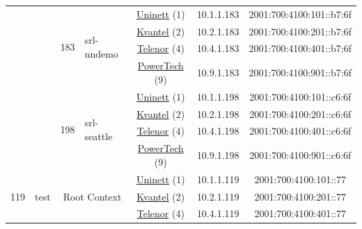 \begin{small}
\begin{center}
\begin{longtable}{|c|c|c|c|c|c|c|c|}
  &  & \multirow{4}{*}{\tiny{183}} & \multicolumn{1}{|l|}{\multirow{4}{*}{\tiny{srl-nndemo}}} & \multicolumn{2}{|c|}{\tiny{\href{https://www.uninett.no}{Uninett} (1)}} & \tiny{10.1.1.183} & \tiny{2001:700:4100:101::b7:6f} \\* \cline{5-5}\cline{6-6}\cline{7-7}\cline{8-8}
  &  &  &  & \multicolumn{2}{|c|}{\tiny{\href{http://kvantel.no}{Kvantel} (2)}} & \tiny{10.2.1.183} & \tiny{2001:700:4100:201::b7:6f} \\* \cline{5-5}\cline{6-6}\cline{7-7}\cline{8-8}
  &  &  &  & \multicolumn{2}{|c|}{\tiny{\href{https://www.telenor.no}{Telenor} (4)}} & \tiny{10.4.1.183} & \tiny{2001:700:4100:401::b7:6f} \\* \cline{5-5}\cline{6-6}\cline{7-7}\cline{8-8}
  &  &  &  & \multicolumn{2}{|c|}{\tiny{\href{http://www.powertech.no}{PowerTech} (9)}} & \tiny{10.9.1.183} & \tiny{2001:700:4100:901::b7:6f} \\* \cline{3-3}\cline{4-4}\cline{5-5}\cline{6-6}\cline{7-7}\cline{8-8}
  &  & \multirow{4}{*}{\tiny{198}} & \multicolumn{1}{|l|}{\multirow{4}{*}{\tiny{srl-seattle}}} & \multicolumn{2}{|c|}{\tiny{\href{https://www.uninett.no}{Uninett} (1)}} & \tiny{10.1.1.198} & \tiny{2001:700:4100:101::c6:6f} \\* \cline{5-5}\cline{6-6}\cline{7-7}\cline{8-8}
  &  &  &  & \multicolumn{2}{|c|}{\tiny{\href{http://kvantel.no}{Kvantel} (2)}} & \tiny{10.2.1.198} & \tiny{2001:700:4100:201::c6:6f} \\* \cline{5-5}\cline{6-6}\cline{7-7}\cline{8-8}
  &  &  &  & \multicolumn{2}{|c|}{\tiny{\href{https://www.telenor.no}{Telenor} (4)}} & \tiny{10.4.1.198} & \tiny{2001:700:4100:401::c6:6f} \\* \cline{5-5}\cline{6-6}\cline{7-7}\cline{8-8}
  &  &  &  & \multicolumn{2}{|c|}{\tiny{\href{http://www.powertech.no}{PowerTech} (9)}} & \tiny{10.9.1.198} & \tiny{2001:700:4100:901::c6:6f} \\ \hline
 \multirow{24}{*}{\tiny{119}} & \multicolumn{1}{|l|}{\multirow{24}{*}{\tiny{test}}} & \multicolumn{2}{|c|}{\multirow{4}{*}{\tiny{Root Context}}} & \multicolumn{2}{|c|}{\tiny{\href{https://www.uninett.no}{Uninett} (1)}} & \tiny{10.1.1.119} & \tiny{2001:700:4100:101::77} \\* \cline{5-5}\cline{6-6}\cline{7-7}\cline{8-8}
  &  & \multicolumn{2}{|c|}{} & \multicolumn{2}{|c|}{\tiny{\href{http://kvantel.no}{Kvantel} (2)}} & \tiny{10.2.1.119} & \tiny{2001:700:4100:201::77} \\* \cline{5-5}\cline{6-6}\cline{7-7}\cline{8-8}
  &  & \multicolumn{2}{|c|}{} & \multicolumn{2}{|c|}{\tiny{\href{https://www.telenor.no}{Telenor} (4)}} & \tiny{10.4.1.119} & \tiny{2001:700:4100:401::77} \\* \cline{5-5}\cline{6-6}\cline{7-7}\cline{8-8}

\end{longtable}
\end{center}
\end{small}
